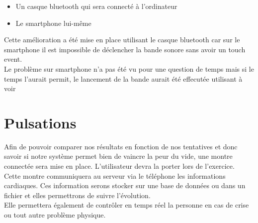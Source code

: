 \begin{itemize}
\item Un casque bluetooth qui sera connecté à l'ordinateur
\item Le smartphone lui-même
\end{itemize}

Cette amélioration a été mise en place utilisant le casque bluetooth car sur le smartphone il est impossible de déclencher la bande sonore sans avoir un touch event. \\
Le problème sur smartphone n'a pas été vu pour une question de temps mais si le temps l'aurait permit, le lancement de la bande aurait été effecutée utilisant \color{red} à voir \color{black} \\


\section{Pulsations}
Afin de pouvoir comparer nos résultats en fonction de nos tentatives et donc savoir si notre système permet bien de vaincre la peur du vide, une montre connectée sera mise en place. L'utilisateur devra la porter lors de l'exercice. \\
Cette montre communiquera au serveur via le téléphone les informations cardiaques. Ces information serons stocker sur une base de données ou dans un fichier et elles permettrons de suivre l'évolution.\\
Elle permettera également de contrôler en temps réel la personne en cas de crise ou tout autre problème physique. 
